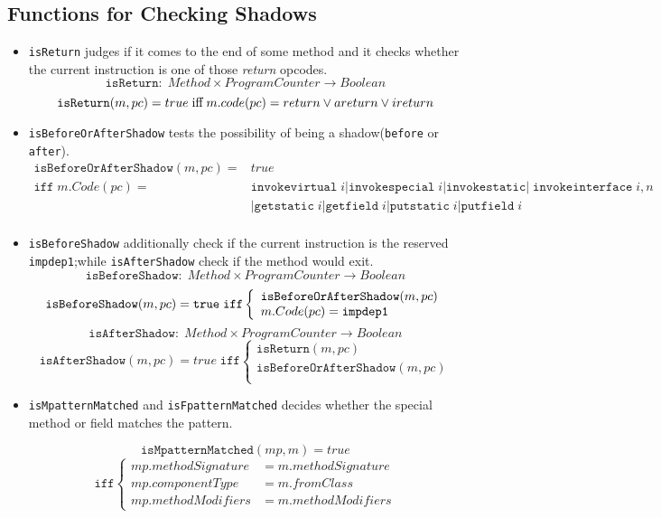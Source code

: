 \subsection{Functions for Checking Shadows}
\begin{itemize}
  \item
  \texttt{isReturn} judges if it comes to the end of some method and it checks whether the current instruction is one of those \textsl{return} opcodes.
$$\texttt{isReturn}:\; Method\times ProgramCounter\rightarrow Boolean$$
$$\texttt{isReturn}(m,pc)=true\;\textnormal{iff}\;m.code(pc)=return\vee areturn\vee ireturn$$

  \item
  \texttt{isBeforeOrAfterShadow} tests the possibility of being a shadow(\texttt{before} or \texttt{after}).
\begin{align*}
  \texttt{isBeforeOrAfterShadow}(m,pc)=&true\\
  \texttt{iff}\;m.Code(pc)=&\texttt{invokevirtual}\;i|\texttt{invokespecial}\;i|\texttt{invokestatic}|\;\texttt{invokeinterface}\;i,n\\
&|\texttt{getstatic}\;i|\texttt{getfield}\;i|\texttt{putstatic}\;i|\texttt{putfield}\;i\\
\end{align*}

  \item
  \texttt{isBeforeShadow} additionally check if the current instruction is the reserved \texttt{impdep1};while \texttt{isAfterShadow} check if the method would exit.
$$\texttt{isBeforeShadow}:\;Method\times ProgramCounter\rightarrow Boolean$$
$$\texttt{isBeforeShadow}(m,pc)=\texttt{true\;iff}\left\{
\begin{array}{l}
  \texttt{isBeforeOrAfterShadow}(m,pc)\\
  m.Code(pc)=\texttt{impdep1}\\
\end{array}
\right.$$
$$\texttt{isAfterShadow}:\; Method\times ProgramCounter\rightarrow Boolean$$
$$\texttt{isAfterShadow}(m,pc)=true \;\texttt{iff} \left\{
\begin{array}{l}
\texttt{isReturn}(m,pc)\\
\texttt{isBeforeOrAfterShadow}(m,pc)\\
\end{array}
\right.$$

\item
\texttt{isMpatternMatched} and \texttt{isFpatternMatched} decides whether the special method or field matches the pattern.
\begin{multicols}{2}
$$ \texttt{isMpatternMatched}(mp,m)=true$$
$$\texttt{iff}\left\{\begin{aligned}
mp.methodSignature&=m.methodSignature\\
mp.componentType&=m.fromClass\\
mp.methodModifiers&=m.methodModifiers
\end{aligned}
\right.$$


\end{multicols}
\end{itemize}
